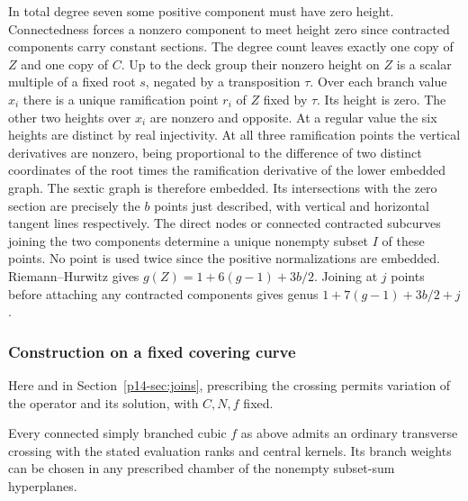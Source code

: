 In total degree seven some positive component must have zero height.
Connectedness forces a nonzero component to meet height zero since
contracted components carry constant sections. The degree count
leaves exactly one copy of $Z$ and one copy of $C$. Up to the deck
group their nonzero height on $Z$ is a scalar multiple of a fixed
root $s$, negated by a transposition $\tau$. Over each branch value
$x_i$ there is a unique ramification point $r_i$ of $Z$ fixed by
$\tau$. Its height is zero. The other two heights over $x_i$ are
nonzero and opposite. At a regular value the six heights are
distinct by real injectivity. At all three ramification points the
vertical derivatives are nonzero, being proportional to the
difference of two distinct coordinates of the root times the
ramification derivative of the lower embedded graph. The sextic
graph is therefore embedded. Its intersections with the zero section
are precisely the $b$ points just described, with vertical and
horizontal tangent lines respectively. The direct nodes or connected
contracted subcurves joining the two components determine a unique
nonempty subset $I$ of these points. No point is used twice since
the positive normalizations are embedded. Riemann--Hurwitz gives
$g(Z)=1+6(g-1)+3b/2$. Joining at $j$ points before attaching any
contracted components gives genus $1+7(g-1)+3b/2+j$.

\subsubsection{Construction on a fixed covering curve}
Here and in Section~\ref{p14-sec:joins}, prescribing the crossing permits
variation of the operator and its solution, with $C,N,f$ fixed.

\begin{proposition}\label{p14-prop:realize}
Every connected simply branched cubic $f$ as above admits an ordinary
transverse crossing with the stated evaluation ranks and central kernels.
Its branch weights can be chosen in any prescribed chamber of the
nonempty subset-sum hyperplanes.
\end{proposition}

